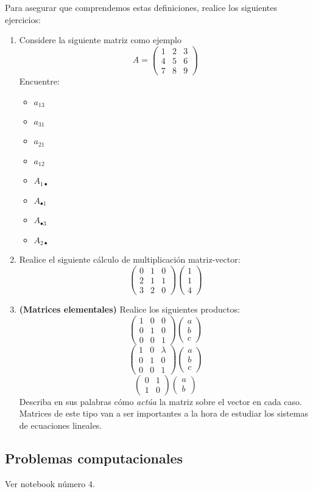 Para asegurar que comprendemos estas definiciones, realice los siguientes ejercicios:

\begin{enumerate}
    \item Considere la siguiente matriz como ejemplo
    $$ A = \begin{pmatrix} 1 & 2 & 3 \\ 4 & 5 & 6 \\ 7 & 8 & 9  \end{pmatrix} $$
    Encuentre:
    \begin{itemize}
        \item $a_{13}$
        \item $a_{31}$
        \item $a_{21}$
        \item $a_{12}$
        \item $A_{1  \bullet}$
        \item $A_{\bullet  1}$
        \item $A_{\bullet  3}$
        \item $A_{2  \bullet}$
    \end{itemize}
    \item Realice el siguiente cálculo de multiplicación matriz-vector:
    $$  \begin{pmatrix} 0 & 1 & 0 \\ 2 & 1 & 1 \\ 3 & 2 & 0  \end{pmatrix} \begin{pmatrix} 1 \\ 1 \\ 4  \end{pmatrix} $$
    \item \textbf{(Matrices elementales)} Realice los siguientes productos:
$$  \begin{pmatrix} 1 & 0 & 0 \\ 0 & 1 & 0 \\ 0 & 0 & 1  \end{pmatrix} \begin{pmatrix} a \\b \\c\end{pmatrix}$$
$$  \begin{pmatrix} 1 & 0 & \lambda \\ 0 & 1 & 0 \\ 0 & 0 & 1  \end{pmatrix} \begin{pmatrix} a \\ b \\ c \end{pmatrix} $$
$$  \begin{pmatrix} 0 & 1 \\ 1 & 0  \end{pmatrix} \begin{pmatrix} a \\ b \end{pmatrix}$$
Describa en sus palabras cómo \textit{actúa} la matriz sobre el vector en cada caso. Matrices de este tipo van a ser importantes a la hora de estudiar los sistemas de ecuaciones lineales.
\end{enumerate}

\subsection{Problemas computacionales}

Ver notebook número 4.